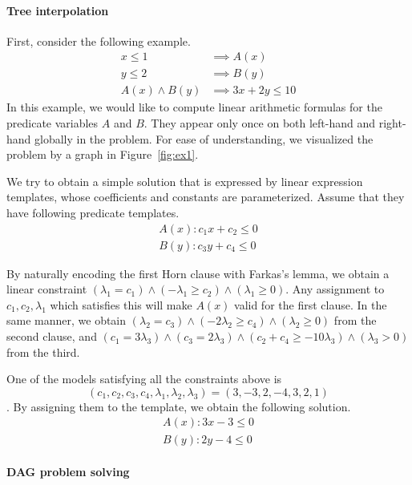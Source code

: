 \paragraph {Tree interpolation}
First, consider the following example.
\begin{align*}
x \leq 1 & \implies A(x) \\
y \leq 2 & \implies B(y) \\
A(x) \wedge B(y) & \implies 3x+2y \leq 10
\end{align*}
In this example, we would like to compute linear arithmetic formulas
for the predicate variables $A$ and $B$.  They appear only once on
both left-hand and right-hand globally in the problem.  For ease of
understanding, we visualized the problem by a graph in Figure~\ref{fig:ex1}.

We try to obtain a simple solution that is expressed by linear
expression templates, whose coefficients and constants are
parameterized.  Assume that they have following predicate templates.
\begin{align*}
A(x) : c_1 x + c_2 \leq 0 \\
B(y) : c_3 y + c_4 \leq 0
\end{align*}

By naturally encoding the first Horn clause with Farkas's lemma, we
obtain a linear constraint
$(\lambda_1 = c_1) \wedge (- \lambda_1 \geq c_2) \wedge (\lambda_1 \geq 0)$.
Any assignment to $ c_1, c_2, \lambda_1 $ which satisfies this will
make $A(x)$ valid for the first clause.  In the same manner, we obtain
$(\lambda_2 = c_3) \wedge (- 2 \lambda_2 \geq c_4) \wedge (\lambda_2 \geq 0)$
from the second clause, and 
$(c_1 = 3 \lambda_3) \wedge (c_3 = 2 \lambda_3) \wedge (c_2 + c_4 \geq -10 \lambda_3) \wedge (\lambda_3 > 0)$
from the third.

One of the models satisfying all the constraints above is
\[( c_1, c_2, c_3, c_4, \lambda_1, \lambda_2, \lambda_3 ) = (3, -3, 2, -4, 3, 2, 1) \].
By assigning them to the template, we obtain the following solution.
\begin{align*}
A(x) : 3 x - 3 \leq 0 \\
B(y) : 2 y - 4 \leq 0
\end{align*}

\paragraph {DAG problem solving}

